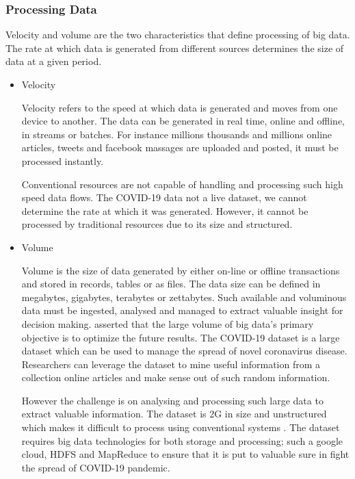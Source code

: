\documentclass[conference]{IEEEtran}
\begin{document}
\subsubsection{Processing Data}
Velocity and volume are the two characteristics that define processing of big data.  The rate at which data is generated from different sources determines the size of data at a given period. 
\begin{itemize}
    \item Velocity
    
    	Velocity refers to the speed at which data is generated and moves from one device to another.  The data can be generated in real time, online and offline, in streams or batches. For instance millions thousands and millions online articles, tweets and facebook massages are uploaded and posted, it must be processed instantly. 
    	
    	
    	Conventional resources are not capable of handling and processing such high speed data flows. The COVID-19 data not a live dataset, we cannot determine the rate at which it was generated. However, it cannot be processed by traditional resources due to its size and structured.
    	
    	\item Volume
    	
    	Volume is the size of data generated by either on-line or offline transactions and stored in records, tables or as files. The data size can be defined in megabytes, gigabytes, terabytes or zettabytes.   Such available and voluminous data must be ingested, analysed and managed to extract valuable insight for decision making. \cite{Owais} asserted that the large volume of big data’s primary objective is to optimize the future results. The COVID-19 dataset is a large dataset which can be used to manage the spread of novel coronavirus disease.  Researchers can leverage the dataset to mine useful information from a collection online articles and make sense out of such random information. 
    	
    	However the challenge is on analysing and processing such large data to extract valuable information. The dataset is 2G in size and unstructured which makes it difficult to process using conventional systems \cite{Patel et al}. The dataset requires big data technologies for both storage and processing; such a google cloud, HDFS and MapReduce to ensure that it is put to valuable sure in fight the spread of COVID-19 pandemic.
\end{itemize}
\end{document}
